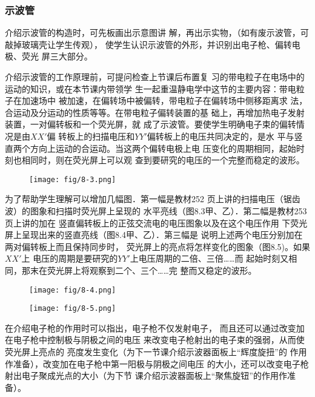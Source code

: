 \subsubsection{示波管} 

介绍示波管的构造时，可先板画出示意图讲
解，再出示实物，（如有废示波管，可敲掉玻璃壳让学生传观），
使学生认识示波管的外形，并识别出电子枪、偏转电极、荧光
屏三大部分。

介绍示波管的工作原理前，可提问检查上节课后布置复
习的带电粒子在电场中的运动的知识，或在本节课内带领学
生一起重温静电学中这节的主要内容：带电粒子在加速场中
被加速，在偏转场中被偏转，带电粒子在偏转场中侧移距离求
法，合运动及分运动的性质等等。在带电粒子偏转装置的基
础上，再增加热电子发射装置，一对偏转板和一个荧光屏，就
成了示波管。要使学生明确电子束的偏转情况是由$XX'$偏
转板上的扫描电压和$YY'$偏转板上的电压共同决定的，是水
平与竖直两个方向上运动的合运动。当这两个偏转电极上电
压变化的周期相同，起始时刻也相同时，则在荧光屏上可以观
查到要研究的电压的一个完整而稳定的波形。

\begin{figure}[htp]
    \centering
\texttt{[image: fig/8-3.png]}
    \caption{}
\end{figure}

为了帮助学生理解可以增加几幅图．第一幅是教材252
页上讲的扫描电压（锯齿波）的图象和扫描时荧光屏上呈现的
水平亮线（图8.3甲、乙）．第二幅是教材253页上讲的加在
竖直偏转板上的正弦交流电的电压图象以及在这个电压作用
下荧光屏上呈现出来的竖直亮线（图8.4甲、乙）．第三幅是
说明上述两个电压分别加在两对偏转板上而且保持同步时，
荧光屏上的亮点将怎样变化的图象（图8.5)。如果$XX'$上
电压的周期是要研究的$YY'$上电压周期的二倍、三倍……而
起始时刻又相同，那末在荧光屏上将观察到二个、三个……完
整而又稳定的波形。
\begin{figure}[htp]
    \centering
\texttt{[image: fig/8-4.png]}
    \caption{}
\end{figure}

\begin{figure}[htp]
    \centering
\texttt{[image: fig/8-5.png]}
    \caption{}
\end{figure}

在介绍电子枪的作用时可以指出，电子枪不仅发射电子，
而且还可以通过改变加在电子枪中控制极与阴极之间的电压
来改变电子枪射出的电子束的强弱，从而使荧光屏上亮点的
亮度发生变化（为下一节课介绍示波器面板上“辉度旋扭”的
作用作准备），改变加在电子枪中第一阳极与阴极之间电压
的大小，还可以改变电子枪射出电子聚成光点的大小（为下节
课介绍示波器面板上“聚焦旋钮”的作用作准备）。

